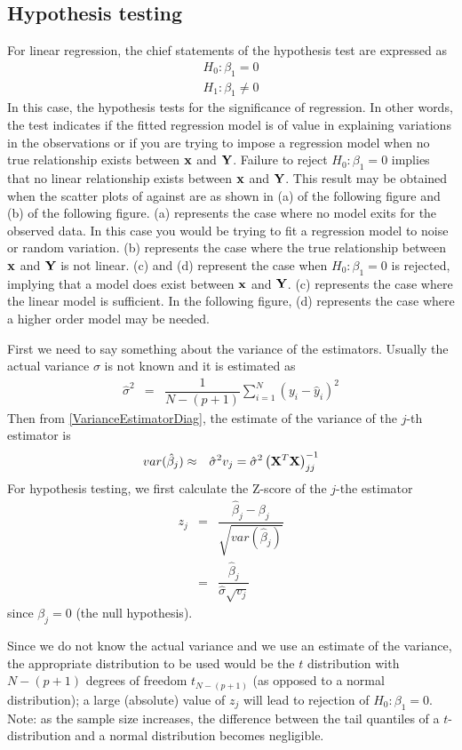 \documentclass[11pt]{article}
\theoremstyle{remark}
\begin{document}
\subsection{Hypothesis testing}
For linear regression, the chief statements of the hypothesis test are expressed as
\begin{eqnarray}
H_0: \beta_1 = 0\nonumber\\
H_1: \beta_1 \ne 0
\end{eqnarray}
In this case, the hypothesis tests for the significance of regression. In other words, the test indicates if the fitted regression model is of value in explaining variations in the observations or if you are trying to impose a regression model when no true relationship exists between $\bold{x}$ and $\bold{Y}$. Failure to reject $H_0: \beta_1 = 0$ implies that no linear relationship exists between $\bold{x}$ and $\bold{Y}$. This result may be obtained when the scatter plots of against are as shown in (a) of the following figure and (b) of the following figure. (a) represents the case where no model exits for the observed data. In this case you would be trying to fit a regression model to noise or random variation. (b) represents the case where the true relationship between $\bold{x}$ and $\bold{Y}$ is not linear. (c) and (d) represent the case when $H_0: \beta_1 = 0$ is rejected, implying that a model does exist between $\bold{x}$ and $\bold{Y}$. (c) represents the case where the linear model is sufficient. In the following figure, (d) represents the case where a higher order model may be needed.

First we need to say something about the variance of the estimators. Usually the actual variance $\sigma$ is not known and it is estimated as
\begin{eqnarray}
\hat{\sigma}^2 &=&\dfrac{1}{N-(p+1)}\sum_{i=1}^N(y_i-\hat{y}_i)^2
\end{eqnarray}
Then from \eqref{VarianceEstimatorDiag}, the estimate of the variance of the $j$-th estimator is
\begin{eqnarray}
var(\hat{\beta}_j) &\approx& \hat{\sigma}^2 v_j = \hat{\sigma}^2 \left(\bold{X}^T\bold{X}\right)^{-1}_{jj}\label{VarianceEstimatorDiagEstimate}
\end{eqnarray}
For hypothesis testing, we first calculate the Z-score of the $j$-the estimator
\begin{eqnarray}
z_j &=&\dfrac{\hat{\beta}_j - \beta_j}{\sqrt{var(\hat{\beta}_j)}}\nonumber\\
&=&\dfrac{\hat{\beta}_j}{\hat{\sigma} \sqrt{v_j}}
\end{eqnarray}
since $\beta_j = 0$ (the null hypothesis).

Since we do not know the actual variance and we use an estimate of the variance, the appropriate distribution to be used would be the $t$ distribution with $N-(p+1)$ degrees of freedom $t_{N-(p+1)}$ (as opposed to a normal distribution); a large (absolute) value of $z_j$ will lead to rejection of $H_0: \beta_1 = 0$. Note: as the sample size increases, the difference between the tail quantiles of a $t$-distribution and a normal distribution becomes negligible.



\end{document}
